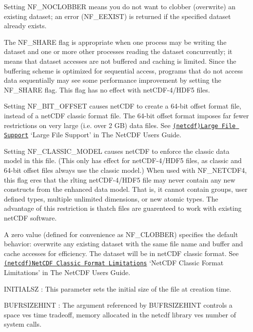Setting N\+F\+\_\+\+N\+O\+C\+L\+O\+B\+B\+ER means you do not want to clobber (overwrite) an existing dataset; an error (N\+F\+\_\+\+E\+E\+X\+I\+ST) is returned if the specified dataset already exists.

The N\+F\+\_\+\+S\+H\+A\+RE flag is appropriate when one process may be writing the dataset and one or more other processes reading the dataset concurrently; it means that dataset accesses are not buffered and caching is limited. Since the buffering scheme is optimized for sequential access, programs that do not access data sequentially may see some performance improvement by setting the N\+F\+\_\+\+S\+H\+A\+RE flag. This flag has no effect with net\+C\+D\+F-\/4/\+H\+D\+F5 files.

Setting N\+F\+\_\+B\+I\+T\+\_\+\+O\+F\+F\+S\+ET causes net\+C\+DF to create a 64-\/bit offset format file, instead of a net\+C\+DF classic format file. The 64-\/bit offset format imposes far fewer restrictions on very large (i.\+e. over 2 GB) data files. See \href{netcdf.html#Large-File-Support}{\tt (netcdf)Large File Support} ‘\+Large File Support’ in The Net\+C\+DF Users Guide.

Setting N\+F\+\_\+\+C\+L\+A\+S\+S\+I\+C\+\_\+\+M\+O\+D\+EL causes net\+C\+DF to enforce the classic data model in this file. (This only has effect for net\+C\+D\+F-\/4/\+H\+D\+F5 files, as classic and 64-\/bit offset files always use the classic model.) When used with N\+F\+\_\+\+N\+E\+T\+C\+D\+F4, this flag eres that the rlting net\+C\+D\+F-\/4/\+H\+D\+F5 file may never contain any new constructs from the enhanced data model. That is, it cannot contain groups, user defined types, multiple unlimited dimensions, or new atomic types. The advantage of this restriction is thatch files are guarenteed to work with existing net\+C\+DF software.

A zero value (defined for convenience as N\+F\+\_\+\+C\+L\+O\+B\+B\+ER) specifies the default behavior\+: overwrite any existing dataset with the same file name and buffer and cache accesses for efficiency. The dataset will be in net\+C\+DF classic format. See \href{netcdf.html#NetCDF-Classic-Format-Limitations}{\tt (netcdf)Net\+C\+DF Classic Format Limitations} ‘\+Net\+C\+DF Classic Format Limitations’ in The Net\+C\+DF Users Guide.

{\ttfamily I\+N\+I\+T\+I\+A\+L\+SZ} \+: This parameter sets the initial size of the file at creation time.

{\ttfamily B\+U\+F\+R\+S\+I\+Z\+E\+H\+I\+NT} \+: The argument referenced by B\+U\+F\+R\+S\+I\+Z\+E\+H\+I\+NT controls a space ves time tradeoff, memory allocated in the netcdf library ves number of system calls.

